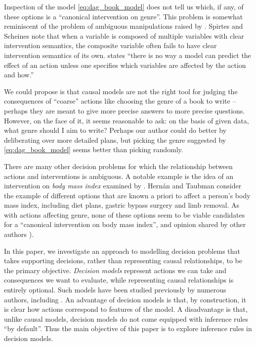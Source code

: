 \documentclass{article}
\begin{document}
Inspection of the model \eqref{eq:dag_book_model} does not tell us which, if any, of these options is a ``canonical intervention on genre''. This problem is somewhat reminiscent of the problem of ambiguous manipulations raised by \citet{spirtes_causal_2004}. Spirtes and Scheines note that when a variable is composed of multiple variables with clear intervention semantics, the composite variable often fails to have clear intervention semantics of its own. \citet[Ch. ~11]{pearl_causality:_2009} states ``there is no way a model can predict the effect of an action unless one specifies which variables are affected by the action and how.''

We could propose is that causal models are not the right tool for judging the consequences of ``coarse'' actions like choosing the genre of a book to write -- perhaps they are meant to give more precise answers to more precise questions. However, on the face of it, it seems reasonable to ask: on the basis of given data, what genre should I aim to write? Perhaps our author could do better by deliberating over more detailed plans, but picking the genre suggested by \eqref{eq:dag_book_model} seems better than picking randomly.

There are many other decision problems for which the relationship between actions and interventions is ambiguous. A notable example is the idea of an intervention on \emph{body mass index} examined by \citep{hernan_does_2008,noauthor_does_2016}. Hernán and Taubman consider the example of different options that are known a priori to affect a person's body mass index, including diet plans, gastric bypass surgery and limb removal. As with actions affecting genre, none of these options seem to be viable candidates for a ``canonical intervention on body mass index'', and opinion shared by other authors \citep{pearl_does_2018,hernanInvitedCommentaryCausal2009,shahar_association_2009}).

In this paper, we investigate an approach to modelling decision problems that takes supporting decisions, rather than representing causal relationships, to be the primary objective. \emph{Decision models} represent actions we can take and consequences we want to evaluate, while representing causal relationships is entirely optional. Such models have been studied previously by numerous authors, including \citet{heckerman_decision-theoretic_1995,dawid_decision-theoretic_2012,dawid_decision-theoretic_2020,lattimore_causal_2019,lattimore_replacing_2019}. An advantage of decision models is that, by construction, it is clear how actions correspond to features of the model. A disadvantage is that, unlike causal models, decision models do not come equipped with inference rules ``by default''. Thus the main objective of this paper is to explore inference rules in decision models.
\end{document}
